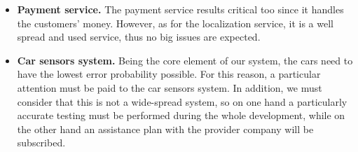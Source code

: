 \begin{description}
\begin{itemize}
				\item \textbf{Payment service.} The payment service results critical too since it handles the customers' money. However, as for the localization service, it is a well spread and used service, thus no big issues are expected.
				\item \textbf{Car sensors system.} Being the core element of our system, the cars need to have the lowest error probability possible. For this reason, a particular attention must be paid to the car sensors system. In addition, we must consider that this is not a wide-spread system, so on one hand a particularly accurate testing must be performed during the whole development, while on the other hand an assistance plan with the provider company will be subscribed.
			\end{itemize}
	\end{description}

